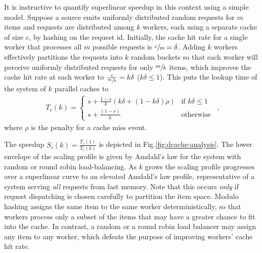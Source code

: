 It is instructive to quantify superlinear speedup in this context using a simple model. Suppose a source emits uniformly distributed random requests for $m$ items and requests are distributed among $k$ workers, each using a separate cache of size $c$, by hashing on the request id.  Initially, the cache hit rate for a single worker that processes all $m$ possible requests is $\sfrac{c}{m}=\delta$. Adding $k$ workers effectively partitions the requests into $k$ random buckets so that each worker will perceive uniformly distributed requests for only $\sfrac{m}{k}$ items, which improves the cache hit rate at each worker to $\frac{c}{\sfrac{m}{k}} = k\delta$ ($k\delta \le 1$). This puts the lookup time of the system of $k$ parallel caches to
\begin{align}\label{eq:dist-cache}
  T_c(k) = \begin{cases} s + \frac{1-s}{k}(k\delta + (1-k\delta)\rho) & \text{if } k\delta \le 1\\s + \frac{(1-s)}{k} & \text{otherwise}\end{cases} \enspace ,
\end{align}
where $\rho$ is the penalty for a cache miss event.

The speedup $S_c(k)=\frac{T_c(1)}{T_c(k)}$ is depicted in Fig.\ref{fig:dcache-analysis}. The lower envelope of the scaling profile is given by Amdahl's law for the system with random or round robin load-balancing. %
As $k$ grows the scaling profile progresses over a superlinear curve to an elevated Amdahl's law profile, representative of a system serving \emph{all} requests from fast memory. %
Note that this occurs \emph{only} if request dispatching is chosen carefully to partition the item space. Modulo hashing assigns the same item to the same worker deterministically, so that workers process only a subset of the items that may have a greater chance to fit into the cache. In contrast, a random or a round robin load balancer may assign any item to any worker, which defeats the purpose of improving workers' cache hit rate. %

